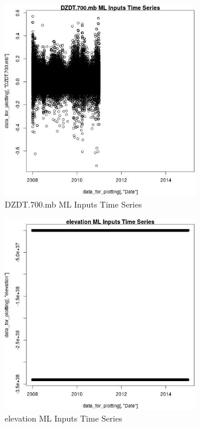 \begin{figure} 
\centering  
\includegraphics[width=0.77\textwidth]{Code_Outputs/ML_input_report_ML_input_PM25_Step5_part_d_de_duplicated_aves_ML_input_DZDT.700.mbTS.jpg} 
\caption{\label{fig:ML_input_report_ML_input_PM25_Step5_part_d_de_duplicated_aves_ML_inputDZDT.700.mbTS}DZDT.700.mb ML Inputs Time Series} 
\end{figure} 
 

\begin{figure} 
\centering  
\includegraphics[width=0.77\textwidth]{Code_Outputs/ML_input_report_ML_input_PM25_Step5_part_d_de_duplicated_aves_ML_input_elevationTS.jpg} 
\caption{\label{fig:ML_input_report_ML_input_PM25_Step5_part_d_de_duplicated_aves_ML_inputelevationTS}elevation ML Inputs Time Series} 
\end{figure} 
 

